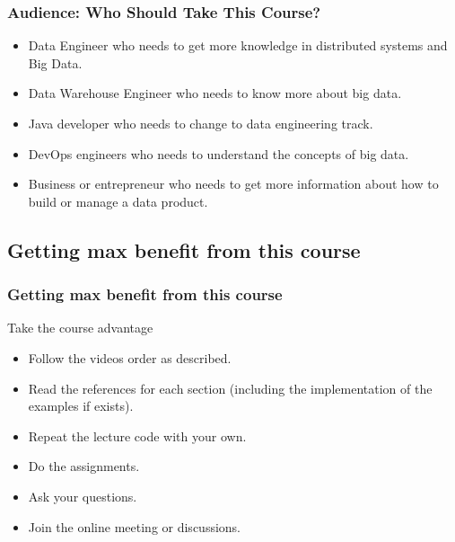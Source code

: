 \begin{frame}
\frametitle{Audience: Who Should Take This Course?}

\begin{itemize}
	\item<1-> Data Engineer who needs to get more knowledge in distributed systems and Big Data. \pause
	\item<2-> Data Warehouse Engineer who needs to know more about big data. \pause
	\item<3-> Java developer who needs to change to data engineering track.  \pause
	\item<4-> DevOps engineers who needs to understand the concepts of big data.  \pause
	\item<5-> Business or entrepreneur who needs to get more information about how to build or manage a data product. \pause
\end{itemize}

\end{frame}


\subsection{Getting max benefit from this course}

\begin{frame}
\frametitle{Getting max benefit from this course}
\begin{block}{Take the course advantage}
\begin{itemize}
	\item<1-> Follow the videos order as described. \pause
	\item<2-> Read the references for each section (including the implementation of the examples if exists). \pause
	\item<3-> Repeat the lecture code with your own.  \pause
	\item<4-> Do the assignments.\pause
	\item<5-> Ask your questions. \pause
	\item<6-> Join the online meeting or discussions. \pause
\end{itemize}
\end{block}

\end{frame}



